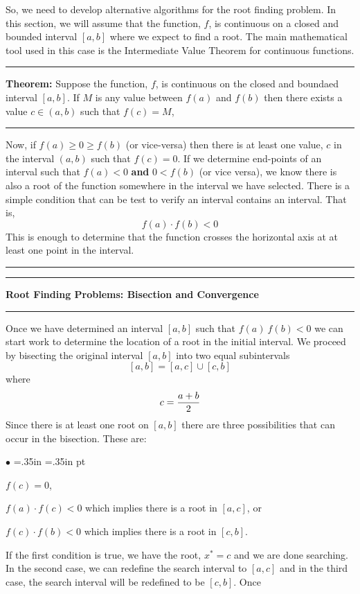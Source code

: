 \documentclass[10pt,fleqn]{article}
\begin{document}
So, we need to develop alternative algorithms for the root finding problem. In
this section, we will assume that the function, $f$, is continuous on a closed
and bounded interval $[a,b]$ where we expect to find a root. The main
mathematical tool used in this case is the Intermediate Value Theorem for
continuous functions.
\vskip0.1in\hrule\vskip0.1in
{\bf Theorem:} Suppose the function, $f$, is continuous on the closed and
boundaed interval $[a, b]$. If $M$ is any value between $f(a)$ and $f(b)$ then
there exists a value $c\in(a,b)$ such that $f(c)=M$,
\vskip0.1in\hrule\vskip0.1in
\noindent
Now, if $f(a)\geq 0\geq f(b)$ (or vice-versa) then there is at least one value,
$c$ in the interval $(a,b)$ such that $f(c)=0$. If we determine end-points of
an interval such that $f(a)<0$ {\bf and} $0<f(b)$ (or vice versa), we know there
is also a root of the function somewhere in the interval we have selected. There
is a simple condition that can be test to verify an interval contains an
interval. That is,
$$
   f(a)\cdot f(b) < 0
$$
This is enough to determine that the function crosses the horizontal axis at
at least one point in the interval.
\vskip0.1in\hrule\vskip0.1in
\newpage
\vskip0.1in\hrule\vskip0.1in
\noindent
{\bf Root Finding Problems: Bisection and Convergence}
\vskip0.1in\hrule\vskip0.1in
\noindent
Once we have determined an interval $[a,b]$ such that $f(a)\ f(b)<0$ we can
start work to determine the location of a root in the initial interval. We
proceed by bisecting the original interval $[a, b]$ into two equal subintervals
$$
  [a, b] = [a, c] \cup [c, b]
$$
where
$$
  c = {{a+b}\over 2}
$$
Since there is at least one root on $[a, b]$ there are three possibilities that
can occur in the bisection. These are:
\begin{list}{$\bullet$}{ \parsep=0pt \listparindent=0pt
\topsep=0pt \rightmargin=.35in \leftmargin=.35in  pt
\itemsep=2pt}
  \item $f(c) = 0$,
  \item $f(a)\cdot f(c)<0$ which implies there is a root in $[a,c]$, or
  \item $f(c)\cdot f(b)<0$ which implies there is a root in $[c,b]$.
\end{list}
If the first condition is true, we have the root, $x^*=c$ and we are done
searching. In the second case, we can redefine the search interval to $[a,c]$
and in the third case, the search interval will be redefined to be $[c,b]$. Once
\end{document}
